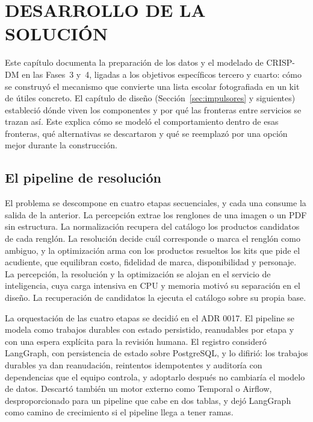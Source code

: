 \setcounter{subsection}{0}
\section{DESARROLLO DE LA SOLUCIÓN}
\label{cap:desarrolloSolucion}

Este capítulo documenta la preparación de los datos y el modelado de CRISP-DM en las Fases~3
y~4, ligadas a los objetivos específicos tercero y cuarto: cómo se construyó el mecanismo que
convierte una lista escolar fotografiada en un kit de útiles concreto. El capítulo de diseño
(Sección~\ref{sec:impulsores} y siguientes) estableció dónde viven los componentes y por qué las
fronteras entre servicios se trazan así. Este explica cómo se modeló el comportamiento dentro de
esas fronteras, qué alternativas se descartaron y qué se reemplazó por una opción mejor durante la
construcción.

\subsection{El pipeline de resolución}
\label{sec:pipeline}

El problema se descompone en cuatro etapas secuenciales, y cada una consume la salida de la
anterior. La percepción extrae los renglones de una imagen o un PDF sin estructura. La
normalización recupera del catálogo los productos candidatos de cada renglón. La resolución decide
cuál corresponde o marca el renglón como ambiguo, y la optimización arma con los productos
resueltos los kits que pide el acudiente, que equilibran costo, fidelidad de marca, disponibilidad y personaje. La
percepción, la resolución y la optimización se alojan en el servicio de inteligencia, cuya carga
intensiva en CPU y memoria motivó su separación en el diseño. La recuperación de candidatos la
ejecuta el catálogo sobre su propia base.

La orquestación de las cuatro etapas se decidió en el ADR 0017. El pipeline se modela como trabajos
durables con estado persistido, reanudables por etapa y con una espera explícita para la revisión
humana. El registro consideró LangGraph, con persistencia de estado sobre PostgreSQL, y lo difirió:
los trabajos durables ya dan reanudación, reintentos idempotentes y auditoría con dependencias que
el equipo controla, y adoptarlo después no cambiaría el modelo de datos. Descartó también un motor
externo como Temporal o Airflow, desproporcionado para un pipeline que cabe en dos tablas, y dejó
LangGraph como camino de crecimiento si el pipeline llega a tener ramas.

